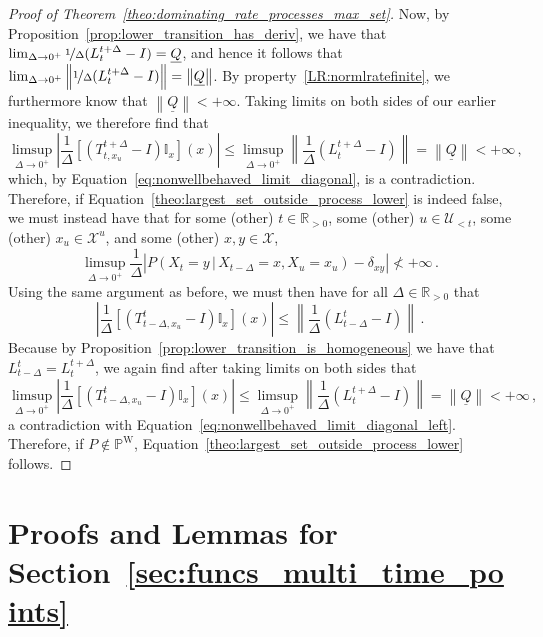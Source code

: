 \documentclass[10pt,a4paper]{paper}
\theoremstyle{definition}
\newcommand{\reals}{\mathbb{R}}
\newcommand{\realspos}{\reals_{>0}}
\newcommand{\states}{\mathcal{X}}
\newcommand{\processes}{\mathbb{P}}
\newcommand{\wprocesses}{\processes^{\mathrm{W}}}
\newcommand{\ind}[1]{\mathbb{I}_{#1}}
\newcommand{\lrate}{\underline{Q}}
\newcommand{\norm}[1]{\left\lVert #1 \right\rVert}
\newcommand{\abs}[1]{\left\vert #1 \right\vert}
\begin{document}
\begin{proof}[Proof of Theorem~\ref{theo:dominating_rate_processes_max_set}]
Now, by Proposition~\ref{prop:lower_transition_has_deriv}, we have that $\lim_{\Delta\to0^+}\nicefrac{1}{\Delta}(L_{t}^{t+\Delta} - I) = \lrate$, and hence it follows that $\lim_{\Delta\to0^+}\norm{\nicefrac{1}{\Delta}(L_{t}^{t+\Delta} - I)} = \norm{\lrate}$. By property~\ref{LR:normlratefinite}, we furthermore know that $\norm{\lrate}<+\infty$. Taking limits on both sides of our earlier inequality, we therefore find that
\begin{equation*}
\limsup_{\Delta\to0^+}\abs{\frac{1}{\Delta}\left[(T_{t,x_u}^{t+\Delta} - I)\ind{x}\right](x)} \leq \limsup_{\Delta\to0^+}\norm{\frac{1}{\Delta}(L_{t}^{t+\Delta} - I)} = \norm{\lrate} < +\infty\,,
\end{equation*}
which, by Equation~\eqref{eq:nonwellbehaved_limit_diagonal}, is a contradiction. Therefore, if Equation~\eqref{theo:largest_set_outside_process_lower} is indeed false, we must instead have that for some (other) $t\in\realspos$, some (other) $u\in\mathcal{U}_{<t}$, some (other) $x_u\in\states^u$, and some (other) $x,y\in\states$,
\begin{equation}\label{eq:nonwellbehaved_limit_diagonal_left}
\limsup_{\Delta\to0^+}\frac{1}{\Delta}\abs{P(X_{t}=y\,\vert\,X_{t-\Delta}=x,X_u=x_u)-\delta_{xy}}\nless+\infty\,.
\end{equation}
Using the same argument as before, we must then have for all $\Delta\in\realspos$ that
\begin{equation*}
\abs{\frac{1}{\Delta}\left[(T_{t-\Delta,x_u}^t - I)\ind{x}\right](x)} \leq \norm{\frac{1}{\Delta}(L_{t-\Delta}^t - I)}\,.
\end{equation*}
Because by Proposition~\ref{prop:lower_transition_is_homogeneous} we have that $L_{t-\Delta}^t=L_t^{t+\Delta}$, we again find after taking limits on both sides that
\begin{equation*}
\limsup_{\Delta\to0^+}\abs{\frac{1}{\Delta}\left[(T_{t-\Delta,x_u}^t - I)\ind{x}\right](x)} \leq \limsup_{\Delta\to0^+}\norm{\frac{1}{\Delta}(L_{t}^{t+\Delta} - I)} = \norm{\lrate} < +\infty\,,
\end{equation*}
a contradiction with Equation~\eqref{eq:nonwellbehaved_limit_diagonal_left}. Therefore, if $P\notin\wprocesses$, Equation~\eqref{theo:largest_set_outside_process_lower} follows.
\end{proof}

\section{Proofs and Lemmas for Section~\ref{sec:funcs_multi_time_points}}
\end{document}

